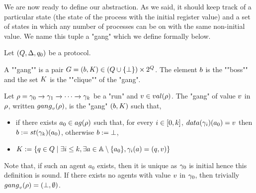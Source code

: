 %	
%	
\label{sec:abstraction}

We are now ready to define our abstraction. As we said, it should keep track of a particular state (the state of the process with the initial register value) and a set of states in which any number of processes can be on with the same non-initial value. We name this tuple a "gang" which we define formally below.

\begin{definition}
	Let $(Q,\Delta, q_0)$ be a protocol.

	A ""gang"" is a pair $\gang = (\boss, \clique) \in (Q \cup \set{\noboss}) \times \powerset{Q}$. The element $\boss$ is the ""boss"" and the set $\clique$ is the ""clique"" of the "gang". %

	Let $\rho = \gamma_0 \xrightarrow{} \gamma_1 \xrightarrow{} \cdots \xrightarrow{} \gamma_k$ be a "run" and $\aval \in \valsof{\run}$. The "gang" of value $v$ in $\rho$, written $\gangof{\aval}{\run}$, is the "gang" $(\boss, \clique)$ such that, 
	\begin{itemize}
	\item if there exists $a_0 \in \agentsof{\run}$ such that, 
	for every 
	$i \in [0,k]$, 
	$\data{\config_i}(a_0) = \aval$ then $\boss := \st{\config_k}(a_0)$, otherwise $\boss := \noboss$, 
	\item  $\clique := \set{q \in Q \mid \exists i \leq k, \exists a \in \agents\setminus \set{a_0}, \config_i(a) = (q,\aval)}$ %
	\end{itemize}
Note that, if such an agent $a_0$ exists, then it is unique as $\gamma_0$ is initial hence this definition is sound. If there exists no agents with value $v$ in $\gamma_0$, then trivially $\gangof{\aval}{\run} = (\noboss, \emptyset)$. 
\end{definition} 

